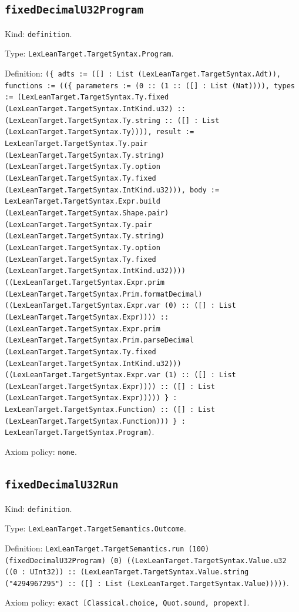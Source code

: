 \documentclass[11pt]{article}
\begin{document}
\subsection*{\texttt{fixedDecimalU32Program}}
\noindent Kind: \texttt{definition}.\par
\noindent Type: \texttt{LexLeanTarget.TargetSyntax.Program}.\par
\noindent Definition: \texttt{(\{ adts := ([] : List (LexLeanTarget.TargetSyntax.Adt)), functions := ((\{ parameters := (0 :: (1 :: ([] : List (Nat)))), types := (LexLeanTarget.TargetSyntax.Ty.fixed (LexLeanTarget.TargetSyntax.IntKind.u32) :: (LexLeanTarget.TargetSyntax.Ty.string :: ([] : List (LexLeanTarget.TargetSyntax.Ty)))), result := LexLeanTarget.TargetSyntax.Ty.pair (LexLeanTarget.TargetSyntax.Ty.string) (LexLeanTarget.TargetSyntax.Ty.option (LexLeanTarget.TargetSyntax.Ty.fixed (LexLeanTarget.TargetSyntax.IntKind.u32))), body := LexLeanTarget.TargetSyntax.Expr.build (LexLeanTarget.TargetSyntax.Shape.pair) (LexLeanTarget.TargetSyntax.Ty.pair (LexLeanTarget.TargetSyntax.Ty.string) (LexLeanTarget.TargetSyntax.Ty.option (LexLeanTarget.TargetSyntax.Ty.fixed (LexLeanTarget.TargetSyntax.IntKind.u32)))) ((LexLeanTarget.TargetSyntax.Expr.prim (LexLeanTarget.TargetSyntax.Prim.formatDecimal) ((LexLeanTarget.TargetSyntax.Expr.var (0) :: ([] : List (LexLeanTarget.TargetSyntax.Expr)))) :: (LexLeanTarget.TargetSyntax.Expr.prim (LexLeanTarget.TargetSyntax.Prim.parseDecimal (LexLeanTarget.TargetSyntax.Ty.fixed (LexLeanTarget.TargetSyntax.IntKind.u32))) ((LexLeanTarget.TargetSyntax.Expr.var (1) :: ([] : List (LexLeanTarget.TargetSyntax.Expr)))) :: ([] : List (LexLeanTarget.TargetSyntax.Expr))))) \} : LexLeanTarget.TargetSyntax.Function) :: ([] : List (LexLeanTarget.TargetSyntax.Function))) \} : LexLeanTarget.TargetSyntax.Program)}.\par
\noindent Axiom policy: \texttt{none}.\par
\subsection*{\texttt{fixedDecimalU32Run}}
\noindent Kind: \texttt{definition}.\par
\noindent Type: \texttt{LexLeanTarget.TargetSemantics.Outcome}.\par
\noindent Definition: \texttt{LexLeanTarget.TargetSemantics.run (100) (fixedDecimalU32Program) (0) ((LexLeanTarget.TargetSyntax.Value.u32 ((0 : UInt32)) :: (LexLeanTarget.TargetSyntax.Value.string ("4294967295") :: ([] : List (LexLeanTarget.TargetSyntax.Value)))))}.\par
\noindent Axiom policy: \texttt{exact [Classical.choice, Quot.sound, propext]}.\par
\end{document}
